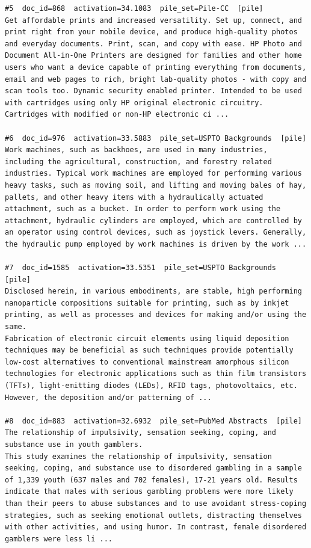 \begin{verbatim}
#5  doc_id=868  activation=34.1083  pile_set=Pile-CC  [pile]
Get affordable prints and increased versatility. Set up, connect, and print right from your mobile device, and produce high-quality photos and everyday documents. Print, scan, and copy with ease. HP Photo and Document All-in-One Printers are designed for families and other home users who want a device capable of printing everything from documents, email and web pages to rich, bright lab-quality photos - with copy and scan tools too. Dynamic security enabled printer. Intended to be used with cartridges using only HP original electronic circuitry. Cartridges with modified or non-HP electronic ci ...

#6  doc_id=976  activation=33.5883  pile_set=USPTO Backgrounds  [pile]
Work machines, such as backhoes, are used in many industries, including the agricultural, construction, and forestry related industries. Typical work machines are employed for performing various heavy tasks, such as moving soil, and lifting and moving bales of hay, pallets, and other heavy items with a hydraulically actuated attachment, such as a bucket. In order to perform work using the attachment, hydraulic cylinders are employed, which are controlled by an operator using control devices, such as joystick levers. Generally, the hydraulic pump employed by work machines is driven by the work ...

#7  doc_id=1585  activation=33.5351  pile_set=USPTO Backgrounds  [pile]
Disclosed herein, in various embodiments, are stable, high performing nanoparticle compositions suitable for printing, such as by inkjet printing, as well as processes and devices for making and/or using the same.
Fabrication of electronic circuit elements using liquid deposition techniques may be beneficial as such techniques provide potentially low-cost alternatives to conventional mainstream amorphous silicon technologies for electronic applications such as thin film transistors (TFTs), light-emitting diodes (LEDs), RFID tags, photovoltaics, etc. However, the deposition and/or patterning of ...

#8  doc_id=883  activation=32.6932  pile_set=PubMed Abstracts  [pile]
The relationship of impulsivity, sensation seeking, coping, and substance use in youth gamblers.
This study examines the relationship of impulsivity, sensation seeking, coping, and substance use to disordered gambling in a sample of 1,339 youth (637 males and 702 females), 17-21 years old. Results indicate that males with serious gambling problems were more likely than their peers to abuse substances and to use avoidant stress-coping strategies, such as seeking emotional outlets, distracting themselves with other activities, and using humor. In contrast, female disordered gamblers were less li ...


\end{verbatim}
